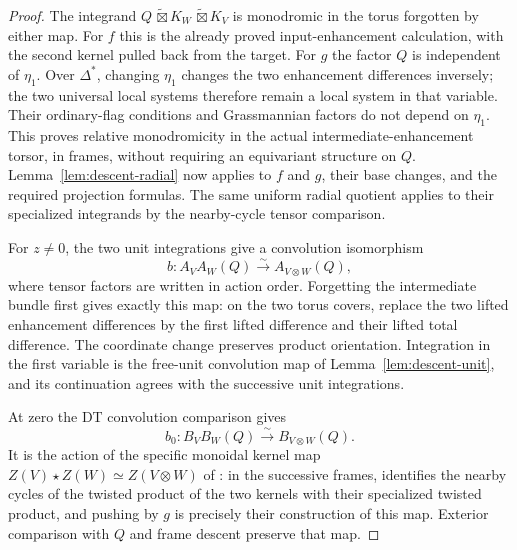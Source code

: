 \begin{proof}
The integrand $Q\,\widetilde\boxtimes K_W
\,\widetilde\boxtimes K_V$ is monodromic in the torus forgotten by
either map.  For $f$ this is the already proved input-enhancement
calculation, with the second kernel pulled back from the target.
For $g$ the factor $Q$ is independent of $\eta_1$.  Over $\Delta^*$,
changing $\eta_1$ changes the two enhancement differences inversely;
the two universal local systems therefore remain a local system in
that variable.  Their ordinary-flag conditions and Grassmannian
factors do not depend on $\eta_1$.  This proves relative
monodromicity in the actual intermediate-enhancement torsor, in
frames, without requiring an equivariant structure on $Q$.
Lemma~\ref{lem:descent-radial} now applies to $f$ and $g$, their base
changes, and the required projection formulas.  The same uniform
radial quotient applies to their specialized integrands by the
nearby-cycle tensor comparison.

For $z\ne0$, the two unit integrations give a convolution isomorphism
\[
 b:A_VA_W(Q)\xrightarrow{\sim}A_{V\otimes W}(Q),
\]
where tensor factors are written in action order.  Forgetting the
intermediate bundle first gives exactly this map: on the two torus
covers, replace the two lifted enhancement differences by the first
lifted difference and their lifted total difference.  The coordinate
change preserves product orientation.  Integration in the first
variable is the free-unit convolution map of
Lemma~\ref{lem:descent-unit}, and its continuation agrees with the
successive unit integrations.

At zero the DT convolution comparison gives
\[
 b_0:B_VB_W(Q)\xrightarrow{\sim}B_{V\otimes W}(Q).
\]
It is the action of the specific monoidal kernel map
$Z(V)\star Z(W)\simeq Z(V\otimes W)$ of
\cite[Section~6.3]{DT}: in the successive frames,
\cite[Lemma~6.3.2]{DT} identifies the nearby cycles of the twisted
product of the two kernels with their specialized twisted product,
and pushing by $g$ is precisely their construction of this map.
Exterior comparison with $Q$ and frame descent preserve that map.


\end{proof}
